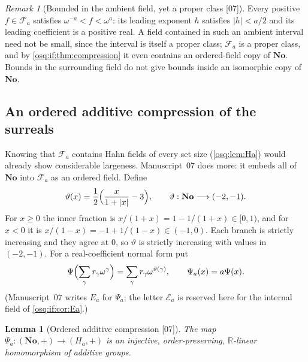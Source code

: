 \documentclass[11pt,letterpaper]{article}
\numberwithin{equation}{section}
\newtheorem{lemma}[lemma]{Lemma}
\theoremstyle{definition}
\theoremstyle{remark}
\newtheorem{remark}[remark]{Remark}
\theoremstyle{plain}
\newcommand{\No}{\mathbf{No}}
\newcommand{\R}{\mathbb R}
\newcommand{\FF}{\mathscr F}         %
\newcommand{\EE}{\mathscr E}         %
\newcommand{\src}[1]{\textup{\textsf{[#1]}}}
\begin{document}
\begin{remark}[Bounded in the ambient field, yet a proper class \src{07}]
\label{osq:if:rem:bounded}
Every positive $f\in\FF_a$ satisfies $\omega^{-a}<f<\omega^a$: its leading exponent $h$
satisfies $|h|<a/2$ and its leading coefficient is a positive real. A field contained in
such an ambient interval need not be small, since the interval is itself a proper class;
$\FF_a$ is a proper class, and by \cref{osq:if:thm:compression} it even contains an
ordered-field copy of $\No$. Bounds in the surrounding field do not give bounds inside an
isomorphic copy of $\No$.
\end{remark}

\subsection{An ordered additive compression of the surreals}\label{osq:if:sub:compression}

Knowing that $\FF_a$ contains Hahn fields of every set size (\cref{osq:lem:Ha}) would
already show considerable largeness. Manuscript~07 does more: it embeds all of $\No$ into
$\FF_a$ as an ordered field. Define
\begin{equation}\label{osq:if:eq:theta}
 \vartheta(x)=\frac12\Bigl(\frac{x}{1+|x|}-3\Bigr),\qquad
 \vartheta:\No\longrightarrow(-2,-1).
\end{equation}
For $x\ge0$ the inner fraction is $x/(1+x)=1-1/(1+x)\in[0,1)$, and for $x<0$ it is
$x/(1-x)=-1+1/(1-x)\in(-1,0)$. Each branch is strictly increasing and they agree at $0$,
so $\vartheta$ is strictly increasing with values in $(-2,-1)$. For a real-coefficient
normal form put
\begin{equation}\label{osq:if:eq:Psi}
 \Psi\Bigl(\sum_\gamma r_\gamma\omega^\gamma\Bigr)=\sum_\gamma r_\gamma\omega^{\vartheta(\gamma)},
 \qquad \Psi_a(x)=a\Psi(x).
\end{equation}
(Manuscript~07 writes $E_a$ for $\Psi_a$; the letter $\EE_a$ is reserved here for the
internal field of \cref{osq:if:cor:Ea}.)

\begin{lemma}[Ordered additive compression \src{07}]\label{osq:if:lem:compression}
The map $\Psi_a:(\No,+)\to(H_a,+)$ is an injective, order-preserving, $\R$-linear
homomorphism of additive groups.
\end{lemma}
\end{document}
